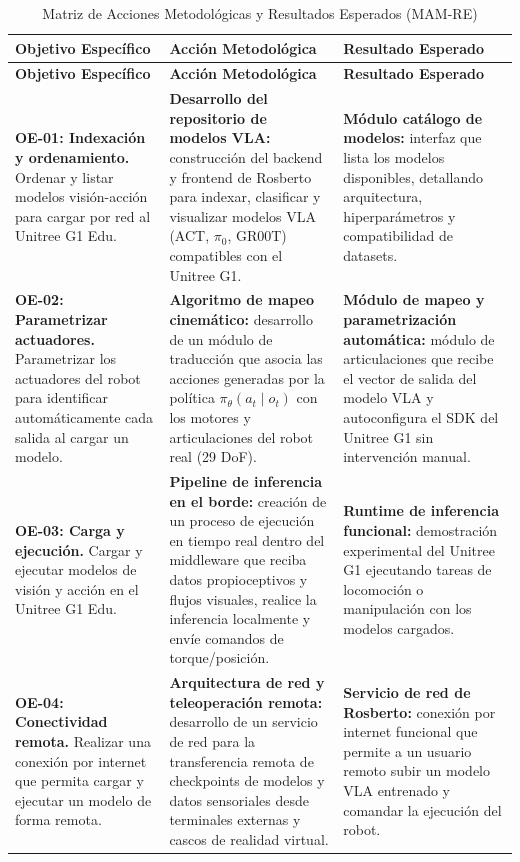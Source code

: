 \documentclass[stu,12pt,floatsintext]{apa7}
\begin{document}
\begin{longtable}{|p{3.6cm}|p{5.4cm}|p{5.4cm}|}
\caption{Matriz de Acciones Metodológicas y Resultados Esperados (MAM-RE)}
\label{tab:mam-re}\\
\hline
\rowcolor{gray!20}
\textbf{Objetivo Específico} & \textbf{Acción Metodológica} & \textbf{Resultado Esperado} \\
\hline
\endfirsthead
\hline
\rowcolor{gray!20}
\textbf{Objetivo Específico} & \textbf{Acción Metodológica} & \textbf{Resultado Esperado} \\
\hline
\endhead

\textbf{OE-01: Indexación y ordenamiento.} Ordenar y listar modelos visión-acción para cargar por red al Unitree G1 Edu. &
\textbf{Desarrollo del repositorio de modelos VLA:} construcción del backend y frontend de Rosberto para indexar, clasificar y visualizar modelos VLA (ACT, $\pi_0$, GR00T) compatibles con el Unitree G1. &
\textbf{Módulo catálogo de modelos:} interfaz que lista los modelos disponibles, detallando arquitectura, hiperparámetros y compatibilidad de datasets. \\
\hline

\textbf{OE-02: Parametrizar actuadores.} Parametrizar los actuadores del robot para identificar automáticamente cada salida al cargar un modelo. &
\textbf{Algoritmo de mapeo cinemático:} desarrollo de un módulo de traducción que asocia las acciones generadas por la política $\pi_{\theta}(a_t \mid o_t)$ con los motores y articulaciones del robot real (29 DoF). &
\textbf{Módulo de mapeo y parametrización automática:} módulo de articulaciones que recibe el vector de salida del modelo VLA y autoconfigura el SDK del Unitree G1 sin intervención manual. \\
\hline

\textbf{OE-03: Carga y ejecución.} Cargar y ejecutar modelos de visión y acción en el Unitree G1 Edu. &
\textbf{Pipeline de inferencia en el borde:} creación de un proceso de ejecución en tiempo real dentro del middleware que reciba datos propioceptivos y flujos visuales, realice la inferencia localmente y envíe comandos de torque/posición. &
\textbf{Runtime de inferencia funcional:} demostración experimental del Unitree G1 ejecutando tareas de locomoción o manipulación con los modelos cargados. \\
\hline

\textbf{OE-04: Conectividad remota.} Realizar una conexión por internet que permita cargar y ejecutar un modelo de forma remota. &
\textbf{Arquitectura de red y teleoperación remota:} desarrollo de un servicio de red para la transferencia remota de checkpoints de modelos y datos sensoriales desde terminales externas y cascos de realidad virtual. &
\textbf{Servicio de red de Rosberto:} conexión por internet funcional que permite a un usuario remoto subir un modelo VLA entrenado y comandar la ejecución del robot. \\
\hline


\end{longtable}
\end{document}
